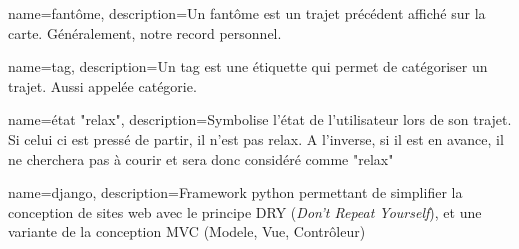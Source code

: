 % 


{
    name=fantôme,
    description={Un fantôme est un trajet précédent affiché sur la carte. Généralement, notre record personnel.}
}

{
    name=tag,
    description={Un tag est une étiquette qui permet de catégoriser un trajet. Aussi appelée catégorie.}
}

{
    name={état "relax"},
description={Symbolise l'état de l'utilisateur lors de son trajet. Si celui ci est pressé de partir, il n'est pas relax. A l'inverse, si il est en avance, il ne cherchera pas à courir et sera donc considéré comme "relax"}
}

{
    name={django},
description={Framework python permettant de simplifier la conception de sites web avec le principe DRY (\textit{Don't Repeat Yourself}), et une variante de la conception MVC (Modele, Vue, Contrôleur)}
}


